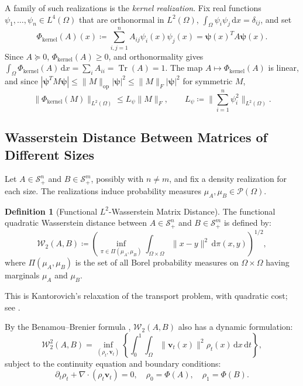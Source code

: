 \documentclass[11pt,a4paper,reqno]{amsart}
\theoremstyle{definition}
\newtheorem{definition}[theorem]{Definition}
\numberwithin{equation}{section}
\newcommand{\Tr}{\operatorname{Tr}}
\newcommand{\dif}{\,\mathrm{d}}
\begin{document}
A family of such realizations is the \emph{kernel realization}. Fix real functions $\psi_1, \dots, \psi_n \in L^4(\Omega)$ that are orthonormal in $L^2(\Omega)$, $\int_\Omega \psi_i \psi_j \dif x = \delta_{ij}$, and set
\begin{equation}
    \Phi_{\mathrm{kernel}}(A)(x) \coloneqq \sum_{i,j=1}^n A_{ij} \psi_i(x) \psi_j(x) = \boldsymbol{\psi}(x)^T A \boldsymbol{\psi}(x).
    \label{eq:kernel_realization}
\end{equation}
Since $A \succeq 0$, $\Phi_{\mathrm{kernel}}(A) \ge 0$, and orthonormality gives $\int_\Omega \Phi_{\mathrm{kernel}}(A) \dif x = \sum_i A_{ii} = \Tr(A) = 1$. The map $A \mapsto \Phi_{\mathrm{kernel}}(A)$ is linear, and since $|\boldsymbol{\psi}^T M \boldsymbol{\psi}| \le \|M\|_{\mathrm{op}} |\boldsymbol{\psi}|^2 \le \|M\|_F |\boldsymbol{\psi}|^2$ for symmetric $M$,
\begin{equation}
    \|\Phi_{\mathrm{kernel}}(M)\|_{L^2(\Omega)} \le L_\psi \|M\|_F, \qquad L_\psi \coloneqq \Big\| \sum_{i=1}^n \psi_i^2 \Big\|_{L^2(\Omega)}.
    \label{eq:kernel_lipschitz}
\end{equation}

\subsection{Wasserstein Distance Between Matrices of Different Sizes}
Let $A \in \mathcal{S}_+^n$ and $B \in \mathcal{S}_+^m$, possibly with $n \ne m$, and fix a density realization for each size. The realizations induce probability measures $\mu_A, \mu_B \in \mathcal{P}(\Omega)$.

\begin{definition}[Functional $L^2$-Wasserstein Matrix Distance]
The functional quadratic Wasserstein distance between $A \in \mathcal{S}_+^n$ and $B \in \mathcal{S}_+^m$ is defined by:
\begin{equation}
    \mathcal{W}_2(A, B) \coloneqq \left( \inf_{\pi \in \Pi(\mu_A, \mu_B)} \int_{\Omega \times \Omega} \|x - y\|^2 \dif \pi(x, y) \right)^{1/2},
    \label{eq:wasserstein_matrix}
\end{equation}
where $\Pi(\mu_A, \mu_B)$ is the set of all Borel probability measures on $\Omega \times \Omega$ having marginals $\mu_A$ and $\mu_B$.
\end{definition}
This is Kantorovich's relaxation \cite{kantorovich2006translocation} of the transport problem, with quadratic cost; see \cite[Ch.~6]{villani2009optimal}.

By the Benamou--Brenier formula \cite{benamou2000computational}, $\mathcal{W}_2(A, B)$ also has a dynamic formulation:
\begin{equation}
    \mathcal{W}_2^2(A, B) = \inf_{(\rho_t, \mathbf{v}_t)} \left\{ \int_0^1 \int_\Omega \|\mathbf{v}_t(x)\|^2 \rho_t(x) \dif x \dif t \right\},
\end{equation}
subject to the continuity equation and boundary conditions:
\begin{equation}
    \partial_t \rho_t + \nabla \cdot (\rho_t \mathbf{v}_t) = 0, \quad \rho_0 = \Phi(A), \quad \rho_1 = \Phi(B).
\end{equation}
\end{document}
